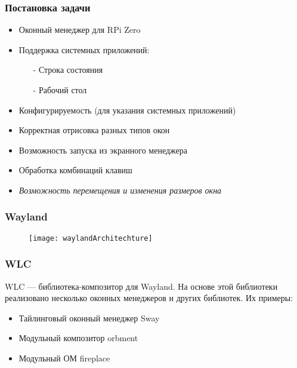 \begin{frame}
\frametitle{Постановка задачи}

\begin{itemize}
\item Оконный менеджер для RPi Zero
\item Поддержка системных приложений:
	\begin{itemize}
	\item[-] Строка состояния
	\item[-] Рабочий стол
	\end{itemize}
\item Конфигурируемость (для указания системных приложений)
\item Корректная отрисовка разных типов окон
\item Возможность запуска из экранного менеджера
\item Обработка комбинаций клавиш
\item \textit{Возможность перемещения и изменения размеров окна}
\end{itemize}

\end{frame}


\begin{frame}
\frametitle{Wayland}

\begin{figure}[h!]
\texttt{[image: waylandArchitechture]}
\end{figure}

\end{frame}


\begin{frame}
\frametitle{WLC}

WLC --- библиотека-композитор для Wayland. На основе этой библиотеки реализовано несколько оконных менеджеров и других библиотек. Их примеры:
\begin{itemize}
\item Тайлинговый оконный менеджер Sway
\item Модульный композитор orbment
\item Модульный ОМ fireplace
\end{itemize}

\end{frame}

